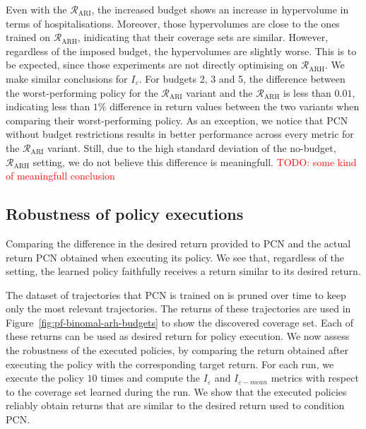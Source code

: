 \documentclass{article}
\newcommand\todo[1]{\textcolor{red}{TODO: #1}}
\newcommand{\mdprewardfn}{\mathcal{R}}
\begin{document}
Even with the $\mdprewardfn_\text{ARI}$, the increased budget shows an increase in hypervolume in terms of hospitalisations. Moreover, those hypervolumes are close to the ones trained on $\mdprewardfn_\text{ARH}$, inidicating that their coverage sets are similar. However, regardless of the imposed budget, the hypervolumes are slightly worse. This is to be expected, since those experiments are not directly optimising on $\mdprewardfn_\text{ARH}$. We make similar conclusions for $I_\varepsilon$. For budgets 2, 3 and 5, the difference between the worst-performing policy for the $\mdprewardfn_\text{ARI}$ variant and the $\mdprewardfn_\text{ARH}$ is less than $0.01$, indicating less than $1\%$ difference in return values between the two variants when comparing their worst-performing policy. As an exception, we notice that PCN without budget restrictions results in better performance across every metric for the $\mdprewardfn_\text{ARI}$ variant. Still, due to the high standard deviation of the no-budget, $\mdprewardfn_\text{ARH}$ setting, we do not believe this difference is meaningfull. \todo{some kind of meaningfull conclusion}

\subsection{Robustness of policy executions}
\label{sec:pcn-robustness}

\begin{table}
    \centering
    \setlength{\tabcolsep}{0.5em} %
    {\renewcommand{\arraystretch}{1.2}%
    
    }
    \caption{Comparing the difference in the desired return provided to PCN and the actual return PCN obtained when executing its policy. We see that, regardless of the setting, the learned policy faithfully receives a return similar to its desired return.}
    \label{tab:pcn-robustness}
\end{table}

The dataset of trajectories that PCN is trained on is pruned over time to keep only the most relevant trajectories. The returns of these trajectories are used in Figure~\ref{fig:pf-binomal-arh-budgets} to show the discovered coverage set. Each of these returns can be used as desired return for policy execution. We now assess the robustness of the executed policies, by comparing the return obtained after executing the policy with the corresponding target return. For each run, we execute the policy $10$ times and compute the $I_\varepsilon$ and $I_{\varepsilon-mean}$ metrics with respect to the coverage set learned during the run. We show that the executed policies reliably obtain returns that are similar to the desired return used to condition PCN.
\end{document}
